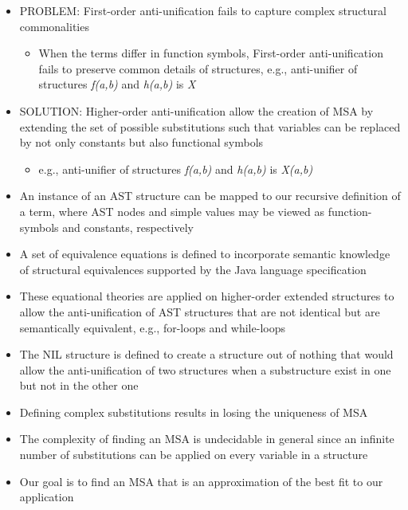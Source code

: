 \documentclass{article}
\newcommand{\tsc}{\textsc}
\newcommand{\vars}{\textit}
\begin{document}
\begin{itemize} [leftmargin=.1in]
\item \tsc{PROBLEM:} First-order anti-unification fails to capture complex structural commonalities
	\begin{itemize}
	\item When the terms differ in function symbols, First-order anti-unification fails to preserve common details of structures, e.g., anti-unifier of structures \vars{f(a,b)} and \vars{h(a,b)} is \vars{X}
	\end{itemize}
\item \tsc{SOLUTION:} Higher-order anti-unification allow the creation of MSA by extending the set of possible substitutions such that variables can be replaced by not only constants but also functional symbols
\begin{itemize}
\item e.g., anti-unifier of structures \vars{f(a,b)} and \vars{h(a,b)} is \vars{X(a,b)}
\end{itemize}
\item An instance of an AST structure can be mapped  to our recursive definition of a term, where AST nodes and simple values may be viewed as function-symbols and constants, respectively

\item A set of equivalence equations is defined to incorporate semantic knowledge of structural equivalences supported by the Java language specification
\item These equational theories are applied on higher-order extended structures to allow the anti-unification of AST structures that are not identical but are semantically equivalent, e.g., for-loops and while-loops

\item The NIL structure is defined to create a structure out of nothing that would allow the anti-unification of two structures when a substructure exist in one but not in the other one

\item Defining complex substitutions results in losing the uniqueness of MSA
\item The complexity of finding an MSA is undecidable in general since an infinite number of substitutions can be applied on every variable in a structure
\item Our goal is to find an MSA that is an approximation of the best fit to our application


\end{itemize}
\end{document}
